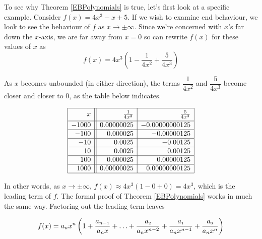 \medskip


\medskip

To see why Theorem \ref{EBPolynomials} is true, let's first look at a specific example.  Consider $f(x) = 4x^3 - x + 5$.  If we wish to examine end behaviour, we look to see the behaviour of $f$ as $x \rightarrow \pm \infty$.  Since we're concerned with $x$'s far down the $x$-axis, we are far away from $x=0$ so can rewrite $f(x)$ for these values of $x$ as \[ f(x) = 4x^3 \left( 1 - \dfrac{1}{4x^2} + \dfrac{5}{4x^3}\right)\]

As $x$ becomes unbounded (in either direction), the terms $\dfrac{1}{4x^2}$ and $\dfrac{5}{4x^3}$ become closer and closer to $0$, as the table below indicates.


\[ \begin{array}{|r||r|r|}  

\hline 

 x & \frac{1}{4x^2} & \frac{5}{4x^3} \vphantom{\dfrac{a}{a}} \\ [2pt] \hline
-1000  & 0.00000025 & -0.00000000125 \\  \hline
-100  & 0.000025 & -0.00000125 \\  \hline
-10 & 0.0025 & -0.00125 \\  \hline
10  & 0.0025 & 0.00125 \\  \hline
100 & 0.000025 & 0.00000125 \\  \hline
1000 & 0.00000025 & 0.00000000125 \\  \hline
\end{array} \]

\smallskip

In other words, as $x \rightarrow \pm \infty$, $f(x) \approx 4x^3\left( 1 - 0 +0\right) = 4x^3$, which is the leading term of $f$.  The formal proof of Theorem \ref{EBPolynomials} works in much the same way.  Factoring out the leading term leaves

\[ f(x) = a_{n} x^{n} \left( 1 + \dfrac{a_{n-\mbox{\tiny$1$}}}{a_{n} x}+ \ldots + \dfrac{a_{\mbox{\tiny$2$}}}{a_{n} x^{n-2}} + \dfrac{a_{\mbox{\tiny$1$}}}{a_{n} x^{n-1}}+\dfrac{a_{\mbox{\tiny$0$}}}{a_{n} x^{n}}\right)\]

